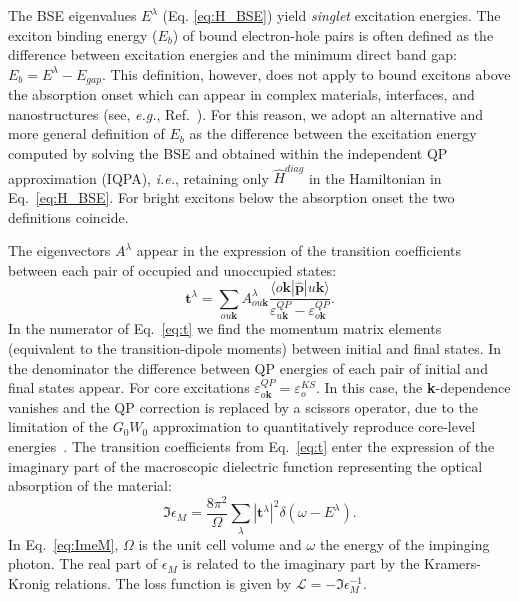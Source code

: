 \documentclass[aps,pra,superscriptaddress,twocolumn]{revtex4}
\begin{document}
The BSE eigenvalues $E^{\lambda}$ (Eq. \ref{eq:H_BSE}) yield \textit{singlet} excitation energies.
The exciton binding energy ($E_b$) of bound electron-hole pairs is often defined as the difference between excitation energies and the minimum direct band gap: $E_b = E^{\lambda} - E_{gap}$.
This definition, however, does not apply to bound excitons above the absorption onset which can appear in complex materials, interfaces, and nanostructures (see, \textit{e.g.}, Ref.~\cite{aggo+17jpcl}).
For this reason, we adopt an alternative and more general definition of $E_b$ as the difference between the excitation energy computed by solving the BSE and obtained within the independent QP approximation (IQPA), \textit{i.e.}, retaining only $\hat{H}^{diag}$ in the Hamiltonian in Eq.~\eqref{eq:H_BSE}.
For bright excitons below the absorption onset the two definitions coincide.

The eigenvectors $A^{\lambda}$ appear in the expression of the transition coefficients between each pair of occupied and unoccupied states:
%
\begin{equation}
\mathbf{t}^{\lambda}= \sum_{ou\mathbf{k}} A^{\lambda}_{ou\mathbf{k}} \frac{\langle o\mathbf{k}|\widehat{\mathbf{p}}|u\mathbf{k}\rangle}{\varepsilon^{QP}_{u\mathbf{k}} - \varepsilon^{QP}_{o\mathbf{k}}} .
\label{eq:t}
\end{equation}
%
In the numerator of Eq.~\eqref{eq:t} we find the momentum matrix elements (equivalent to the transition-dipole moments) between initial and final states.
In the denominator the difference between QP energies of each pair of initial and final states appear.
For core excitations $\varepsilon^{QP}_{o\mathbf{k}} = \varepsilon^{KS}_o$. 
In this case, the \textbf{k}-dependence vanishes and the QP correction is replaced by a scissors operator, due to the limitation of the $G_0W_0$ approximation to quantitatively reproduce core-level energies~\cite{vorw+17prb}.
The transition coefficients from Eq.~\eqref{eq:t} enter the expression of the imaginary part of the macroscopic dielectric function representing the optical absorption of the material:
%
\begin{equation}
\Im\epsilon_M = \dfrac{8\pi^2}{\Omega} \sum_{\lambda} |\mathbf{t}^{\lambda}|^2 \delta(\omega - E^{\lambda}) .
\label{eq:ImeM}
\end{equation}
%
In Eq.~\eqref{eq:ImeM}, $\Omega$ is the unit cell volume and $\omega$ the energy of the impinging photon.
The real part of $\epsilon_M$ is related to the imaginary part by the Kramers-Kronig relations.
The loss function is given by $\mathcal{L} = -\Im\epsilon_M^{-1}$.
\end{document}
